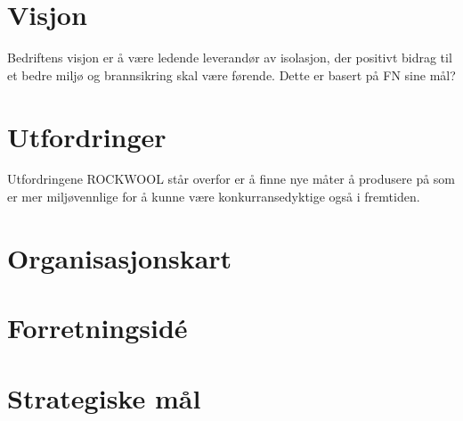 \section{Visjon}
Bedriftens visjon er å være ledende leverandør av isolasjon, der positivt bidrag til et bedre miljø og brannsikring skal være førende. Dette er basert på FN sine mål?

\section{Utfordringer}
Utfordringene ROCKWOOL står overfor er å finne nye måter å produsere på som er mer miljøvennlige for å kunne være konkurransedyktige også i fremtiden.

\section{Organisasjonskart}
\section{Forretningsidé}
\section{Strategiske mål}
